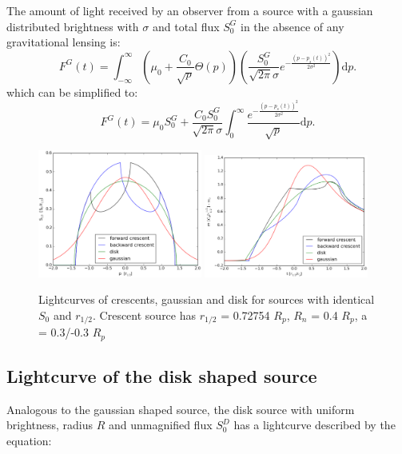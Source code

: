 The amount of light received by an observer from a source with a gaussian distributed brightness with $\sigma$ and total flux $S_0^G$ in the absence of any gravitational lensing is:
\begin{equation}
 F^G(t) = \int_{-\infty}^\infty  \left( \mu_0 + \frac{C_0}{\sqrt{p}} \Theta \left( p \right) \right) \left( \frac{S_0^G}{\sqrt{2 \pi} \sigma} e^{-\frac{(p-p_s(t))^2}{2 \sigma^2}} \right) \mathrm{d}p.
\end{equation}
which can be simplified to:
\begin{equation}
 F^G(t) = \mu_0 S_0^G + \frac{C_0 S_0^G}{\sqrt{2\pi} \sigma} \int_{0}^\infty \frac{e^{-\frac{(p-p_s(t))^2}{2 \sigma^2}}}{\sqrt{p}} \mathrm{d}p.
\end{equation}

\begin{figure}
\centering
	\includegraphics[width = 0.48\textwidth]{plots/4source_profile.eps}
	\includegraphics[width = 0.48\textwidth]{plots/4source_magnification.eps}
\caption{\label{fig:lightcurve_gauss} Lightcurves of crescents, gaussian and disk for sources with identical $S_0$ and $r_{1/2}$. Crescent source has $r_{1/2}$ = 0.72754 $R_p$, $R_n$ = 0.4 $R_p$, a = 0.3/-0.3 $R_p$ }
\end{figure}


\subsection{Lightcurve of the disk shaped source}

Analogous to the gaussian shaped source, the disk source with uniform brightness, radius $R$ and unmagnified flux $S_0^D$ has a lightcurve described by the equation:

